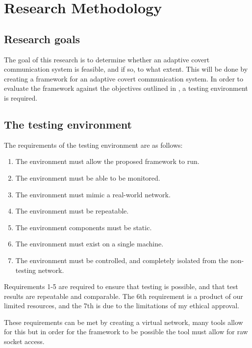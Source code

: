 \chapter{Research Methodology}

\section{Research goals}

The goal of this research is to determine whether an adaptive covert communication system is feasible, and if so, to what extent. This will be done by creating a framework for an adaptive covert communication system.
In order to evaluate the framework against the objectives outlined in ,  a testing environment is required.

\section{The testing environment}
\label{sec:testing_environment}

The requirements of the testing environment are as follows:

\begin{enumerate}
    \item The environment must allow the proposed framework to run.  %
    \item The environment must be able to be monitored. %
    \item The environment must mimic a real-world network. %
    \item The environment must be repeatable. %
    \item The environment components must be static. %
    \item The environment must exist on a single machine. %
    \item The environment must be controlled, and completely isolated from the non-testing network. %
\end{enumerate}


Requirements 1-5 are required to ensure that testing is possible, and that test results are repeatable and comparable. The 6th requirement is a product of our limited resources, and the 7th is due to the limitations of my ethical approval.

These requirements can be met by creating a virtual network, many tools allow for this but in order for the framework to be possible the tool must allow for raw socket access.

